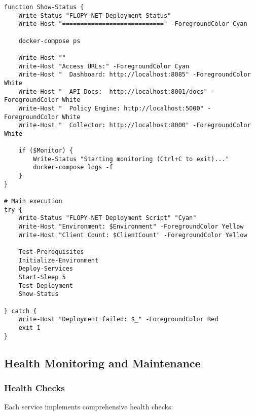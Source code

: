 \begin{lstlisting}[style=dockercode, caption=PowerShell Deployment Script]
function Show-Status {
    Write-Status "FLOPY-NET Deployment Status"
    Write-Host "============================" -ForegroundColor Cyan
    
    docker-compose ps
    
    Write-Host ""
    Write-Host "Access URLs:" -ForegroundColor Cyan
    Write-Host "  Dashboard: http://localhost:8085" -ForegroundColor White
    Write-Host "  API Docs:  http://localhost:8001/docs" -ForegroundColor White
    Write-Host "  Policy Engine: http://localhost:5000" -ForegroundColor White
    Write-Host "  Collector: http://localhost:8000" -ForegroundColor White
    
    if ($Monitor) {
        Write-Status "Starting monitoring (Ctrl+C to exit)..."
        docker-compose logs -f
    }
}

# Main execution
try {
    Write-Status "FLOPY-NET Deployment Script" "Cyan"
    Write-Host "Environment: $Environment" -ForegroundColor Yellow
    Write-Host "Client Count: $ClientCount" -ForegroundColor Yellow
    
    Test-Prerequisites
    Initialize-Environment
    Deploy-Services
    Start-Sleep 5
    Test-Deployment
    Show-Status
    
} catch {
    Write-Host "Deployment failed: $_" -ForegroundColor Red
    exit 1
}
\end{lstlisting}

\subsection{Health Monitoring and Maintenance}

\subsubsection{Health Checks}

Each service implements comprehensive health checks:

